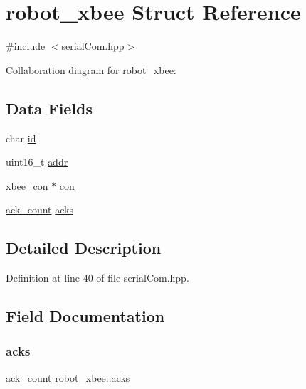 \hypertarget{structrobot__xbee}{}\section{robot\+\_\+xbee Struct Reference}
\label{structrobot__xbee}


{\ttfamily \#include $<$serial\+Com.\+hpp$>$}



Collaboration diagram for robot\+\_\+xbee\+:
\subsection*{Data Fields}
\begin{DoxyCompactItemize}
\item 
char \hyperlink{structrobot__xbee_ab1a46fdd08142591bd40f198030e8892}{id}
\item 
uint16\+\_\+t \hyperlink{structrobot__xbee_a4a917ff920a101fc016ac9d4ede5be46}{addr}
\item 
xbee\+\_\+con $\ast$ \hyperlink{structrobot__xbee_a5920bd16ce0c8287541bd9d727146e91}{con}
\item 
\hyperlink{structack__count}{ack\+\_\+count} \hyperlink{structrobot__xbee_af065c4c2e193371560517f4880f55b54}{acks}
\end{DoxyCompactItemize}


\subsection{Detailed Description}


Definition at line 40 of file serial\+Com.\+hpp.



\subsection{Field Documentation}
\mbox{\label{structrobot__xbee_af065c4c2e193371560517f4880f55b54}} 
\subsubsection{\texorpdfstring{acks}{acks}}
{\footnotesize\ttfamily \hyperlink{structack__count}{ack\+\_\+count} robot\+\_\+xbee\+::acks}



